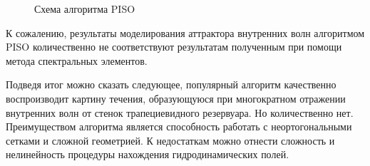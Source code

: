 \begin{figure}[h]
    
    \caption{Схема алгоритма PISO}
    \label{fig:blockSchemePIMPLE}
\end{figure}

К сожалению, результаты моделирования аттрактора внутренних волн алгоритмом PISO количественно не соответствуют результатам полученным при помощи метода спектральных элементов. 

Подведя итог можно сказать следующее, популярный алгоритм качественно воспроизводит картину течения, образующуюся при многократном отражении внутренних волн от стенок трапециевидного резервуара. Но количественно нет. Преимуществом алгоритма является способность работать с неортогональными сетками и сложной геометрией. К недостаткам можно отнести сложность и нелинейность процедуры нахождения гидродинамических полей.


